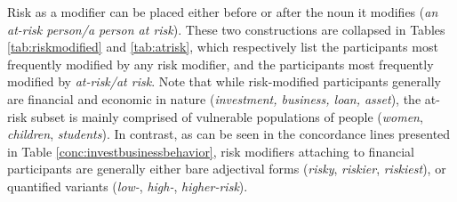 Risk as a modifier can be placed either before or after the noun it modifies (\emph{an at-risk person\slash a person at risk}). These two constructions are collapsed in Tables \ref{tab:riskmodified} and \ref{tab:atrisk}, which respectively list the participants most frequently modified by any risk modifier, and the participants most frequently modified by \emph{at-risk\slash at risk}. Note that while risk-modified participants generally are financial and economic in nature (\emph{investment, business, loan, asset}), the at-risk subset is mainly comprised of vulnerable populations of people (\emph{women}, \emph{children}, \emph{students}). In contrast, as can be seen in the concordance lines presented in Table \ref{conc:investbusinessbehavior}, risk modifiers attaching to financial participants are generally either bare adjectival forms (\emph{risky}, \emph{riskier}, \emph{riskiest}), or quantified variants (\emph{low-}, \emph{high-}, \emph{higher-risk}).

